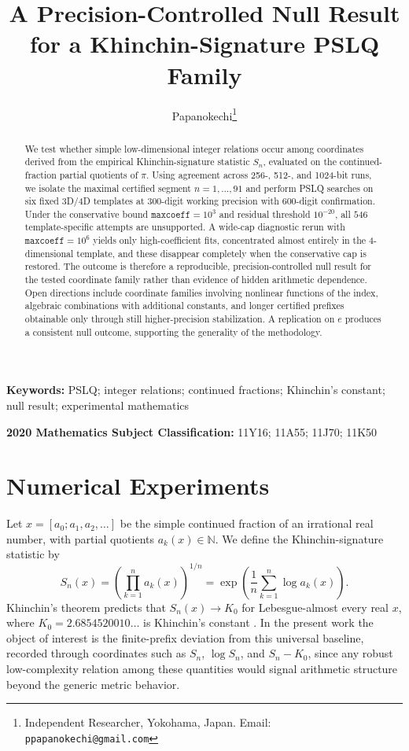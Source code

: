 \documentclass[11pt]{article}
\title{A Precision-Controlled Null Result for a Khinchin-Signature PSLQ Family}
\author{Papanokechi\thanks{Independent Researcher, Yokohama, Japan. Email: \texttt{ppapanokechi@gmail.com}}}
\date{}
\begin{document}
\maketitle

\begin{abstract}
We test whether simple low-dimensional integer relations occur among coordinates derived from the empirical Khinchin-signature statistic $S_n$, evaluated on the continued-fraction partial quotients of $\pi$. Using agreement across 256-, 512-, and 1024-bit runs, we isolate the maximal certified segment $n=1,\ldots,91$ and perform PSLQ searches on six fixed 3D/4D templates at 300-digit working precision with 600-digit confirmation. Under the conservative bound $\texttt{maxcoeff}=10^3$ and residual threshold $10^{-20}$, all $546$ template-specific attempts are unsupported. A wide-cap diagnostic rerun with $\texttt{maxcoeff}=10^6$ yields only high-coefficient fits, concentrated almost entirely in the 4-dimensional template, and these disappear completely when the conservative cap is restored. The outcome is therefore a reproducible, precision-controlled null result for the tested coordinate family rather than evidence of hidden arithmetic dependence. Open directions include coordinate families involving nonlinear functions of the index, algebraic combinations with additional constants, and longer certified prefixes obtainable only through still higher-precision stabilization. A replication on $e$ produces a consistent null outcome, supporting the generality of the methodology.
\end{abstract}

\noindent\textbf{Keywords:} PSLQ; integer relations; continued fractions; Khinchin's constant; null result; experimental mathematics

\medskip
\noindent\textbf{2020 Mathematics Subject Classification:} 11Y16; 11A55; 11J70; 11K50

\section{Numerical Experiments}\label{sec:numerics}

Let $x=[a_0;a_1,a_2,\ldots]$ be the simple continued fraction of an irrational real number, with partial quotients $a_k(x)\in\mathbb{N}$. We define the Khinchin-signature statistic by
\[
S_n(x)=\left(\prod_{k=1}^n a_k(x)\right)^{1/n}=\exp\!\left(\frac{1}{n}\sum_{k=1}^n \log a_k(x)\right).
\]
Khinchin's theorem predicts that $S_n(x)\to K_0$ for Lebesgue-almost every real $x$, where $K_0=2.6854520010\ldots$ is Khinchin's constant \cite{BaileyBorweinCrandall1997,FlajoletVallee2000}. In the present work the object of interest is the finite-prefix deviation from this universal baseline, recorded through coordinates such as $S_n$, $\log S_n$, and $S_n-K_0$, since any robust low-complexity relation among these quantities would signal arithmetic structure beyond the generic metric behavior.
\end{document}
